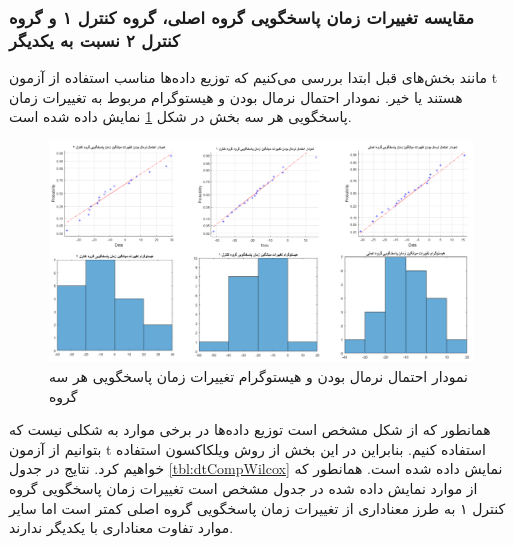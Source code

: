\documentclass[twoside, a4paper,11pt]{book}
\numberwithin{equation}{chapter}
\numberwithin{table}{chapter}
\numberwithin{figure}{chapter}
\numberwithin{equation}{chapter}
\begin{document}
\subsubsection{مقایسه تغییرات زمان پاسخگویی گروه اصلی، گروه کنترل ۱ و گروه کنترل ۲ نسبت به یکدیگر}
مانند بخش‌های قبل ابتدا بررسی می‌کنیم که توزیع داده‌ها مناسب استفاده از آزمون t هستند یا خیر. نمودار احتمال نرمال بودن و هیستوگرام مربوط به تغییرات زمان پاسخگویی هر سه بخش در شکل \ref{fig:dtNorm} نمایش داده شده است.

\begin{figure}
\centering
\includegraphics[scale=0.5]{Figures/dtNorm.png}
\caption{\label{fig:dtNorm}
نمودار احتمال نرمال بودن و هیستوگرام تغییرات زمان پاسخگویی هر سه گروه
}
\end{figure}

همانطور که از شکل مشخص است توزیع داده‌ها در برخی موارد به شکلی نیست که بتوانیم از آزمون t استفاده کنیم. بنابراین در این بخش از روش ویلکاکسون استفاده خواهیم کرد. نتایج در جدول \ref{tbl:dtCompWilcox} نمایش داده شده است. همانطور که از موارد نمایش داده شده در جدول مشخص است تغییرات زمان پاسخگویی گروه کنترل ۱ به طرز معناداری از تغییرات زمان پاسخگویی گروه اصلی کمتر است اما سایر موارد تفاوت معناداری با یکدیگر ندارند.
\end{document}
